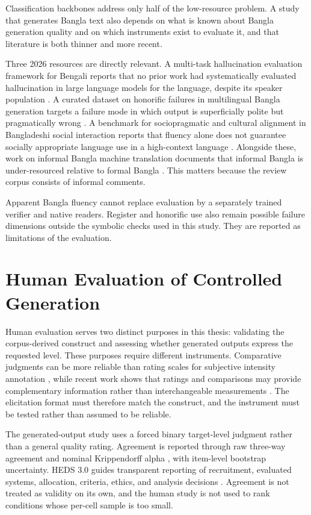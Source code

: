 Classification backbones address only half of the low-resource problem. A study that generates Bangla text also depends on what is known about Bangla generation quality and on which instruments exist to evaluate it, and that literature is both thinner and more recent.

Three 2026 resources are directly relevant. A multi-task hallucination evaluation framework for Bengali reports that no prior work had systematically evaluated hallucination in large language models for the language, despite its speaker population \cite{b98}. A curated dataset on honorific failures in multilingual Bangla generation targets a failure mode in which output is superficially polite but pragmatically wrong \cite{b99}. A benchmark for sociopragmatic and cultural alignment in Bangladeshi social interaction reports that fluency alone does not guarantee socially appropriate language use in a high-context language \cite{b110}. Alongside these, work on informal Bangla machine translation documents that informal Bangla is under-resourced relative to formal Bangla \cite{b111}. This matters because the review corpus consists of informal comments.

Apparent Bangla fluency cannot replace evaluation by a separately trained verifier and native readers. Register and honorific use also remain possible failure dimensions outside the symbolic checks used in this study. They are reported as limitations of the evaluation.

\section{Human Evaluation of Controlled Generation}
\label{sec:human-evaluation}

Human evaluation serves two distinct purposes in this thesis: validating the corpus-derived construct and assessing whether generated outputs express the requested level. These purposes require different instruments. Comparative judgments can be more reliable than rating scales for subjective intensity annotation \cite{b29}, while recent work shows that ratings and comparisons may provide complementary information rather than interchangeable measurements \cite{b30}. The elicitation format must therefore match the construct, and the instrument must be tested rather than assumed to be reliable.

The generated-output study uses a forced binary target-level judgment rather than a general quality rating. Agreement is reported through raw three-way agreement and nominal Krippendorff alpha \cite{b31}, with item-level bootstrap uncertainty. HEDS 3.0 guides transparent reporting of recruitment, evaluated systems, allocation, criteria, ethics, and analysis decisions \cite{b32}. Agreement is not treated as validity on its own, and the human study is not used to rank conditions whose per-cell sample is too small.

